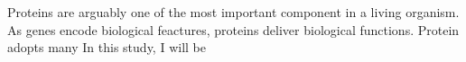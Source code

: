 Proteins are arguably one of the most important component in a living organism. As genes encode biological feactures, proteins deliver biological functions. Protein adopts many   In this study, I will be 